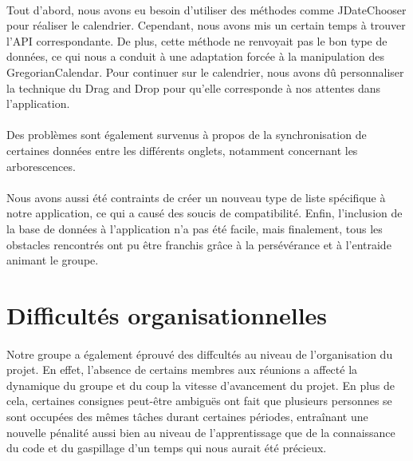 \documentclass[a4paper,10pt]{report}
\begin{document}
      \paragraph{}
	Tout d'abord, nous avons eu besoin d'utiliser des méthodes comme JDateChooser pour réaliser le calendrier. Cependant, nous avons mis un certain temps à trouver l'API correspondante.
	De plus, cette méthode ne renvoyait pas le bon type de données, ce qui nous a conduit à une adaptation forcée à la manipulation des GregorianCalendar.
	Pour continuer sur le calendrier, nous avons dû personnaliser la technique du Drag and Drop pour qu'elle corresponde à nos attentes dans l'application.
	
      \paragraph{}
	Des problèmes sont également survenus à propos de la synchronisation de certaines données entre les différents onglets, notamment concernant les arborescences.

      \paragraph{}
	Nous avons aussi été contraints de créer un nouveau type de liste spécifique à notre application, ce qui a causé des soucis de compatibilité.
	Enfin, l'inclusion de la base de données à l'application n'a pas été facile, mais finalement, tous les obstacles rencontrés ont pu être franchis grâce à la persévérance et à l'entraide animant le groupe.
      
      
      
    \section{Difficultés organisationnelles}
      \paragraph{}
	Notre groupe a également éprouvé des diffcultés au niveau de l'organisation du projet. 
	En effet, l'absence de certains membres aux réunions a affecté la dynamique du groupe et du coup la vitesse d'avancement du projet.
	En plus de cela, certaines consignes peut-être ambiguës ont fait que plusieurs personnes se sont occupées des mêmes tâches durant certaines périodes, entraînant une nouvelle pénalité aussi bien au niveau de l'apprentissage que de la connaissance du code et du gaspillage d'un temps qui nous aurait été précieux.
	
\end{document}
